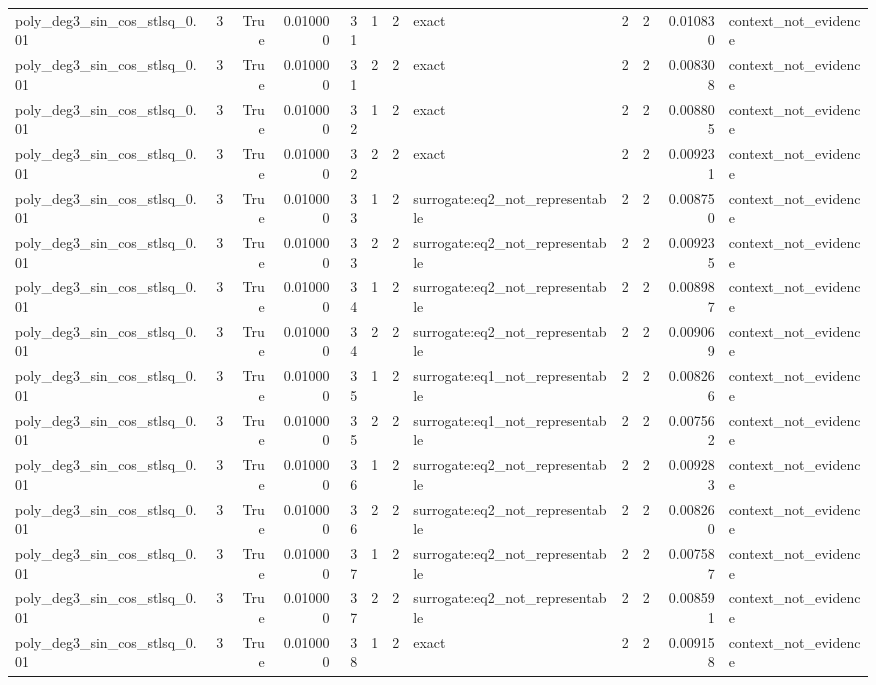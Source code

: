 \begin{tabular}{lrrrrrrlrrrl}
poly\_deg3\_sin\_cos\_stlsq\_0.01 & 3 & True & 0.010000 & 31 & 1 & 2 & exact & 2 & 2 & 0.010830 & context\_not\_evidence \\
poly\_deg3\_sin\_cos\_stlsq\_0.01 & 3 & True & 0.010000 & 31 & 2 & 2 & exact & 2 & 2 & 0.008308 & context\_not\_evidence \\
poly\_deg3\_sin\_cos\_stlsq\_0.01 & 3 & True & 0.010000 & 32 & 1 & 2 & exact & 2 & 2 & 0.008805 & context\_not\_evidence \\
poly\_deg3\_sin\_cos\_stlsq\_0.01 & 3 & True & 0.010000 & 32 & 2 & 2 & exact & 2 & 2 & 0.009231 & context\_not\_evidence \\
poly\_deg3\_sin\_cos\_stlsq\_0.01 & 3 & True & 0.010000 & 33 & 1 & 2 & surrogate:eq2\_not\_representable & 2 & 2 & 0.008750 & context\_not\_evidence \\
poly\_deg3\_sin\_cos\_stlsq\_0.01 & 3 & True & 0.010000 & 33 & 2 & 2 & surrogate:eq2\_not\_representable & 2 & 2 & 0.009235 & context\_not\_evidence \\
poly\_deg3\_sin\_cos\_stlsq\_0.01 & 3 & True & 0.010000 & 34 & 1 & 2 & surrogate:eq2\_not\_representable & 2 & 2 & 0.008987 & context\_not\_evidence \\
poly\_deg3\_sin\_cos\_stlsq\_0.01 & 3 & True & 0.010000 & 34 & 2 & 2 & surrogate:eq2\_not\_representable & 2 & 2 & 0.009069 & context\_not\_evidence \\
poly\_deg3\_sin\_cos\_stlsq\_0.01 & 3 & True & 0.010000 & 35 & 1 & 2 & surrogate:eq1\_not\_representable & 2 & 2 & 0.008266 & context\_not\_evidence \\
poly\_deg3\_sin\_cos\_stlsq\_0.01 & 3 & True & 0.010000 & 35 & 2 & 2 & surrogate:eq1\_not\_representable & 2 & 2 & 0.007562 & context\_not\_evidence \\
poly\_deg3\_sin\_cos\_stlsq\_0.01 & 3 & True & 0.010000 & 36 & 1 & 2 & surrogate:eq2\_not\_representable & 2 & 2 & 0.009283 & context\_not\_evidence \\
poly\_deg3\_sin\_cos\_stlsq\_0.01 & 3 & True & 0.010000 & 36 & 2 & 2 & surrogate:eq2\_not\_representable & 2 & 2 & 0.008260 & context\_not\_evidence \\
poly\_deg3\_sin\_cos\_stlsq\_0.01 & 3 & True & 0.010000 & 37 & 1 & 2 & surrogate:eq2\_not\_representable & 2 & 2 & 0.007587 & context\_not\_evidence \\
poly\_deg3\_sin\_cos\_stlsq\_0.01 & 3 & True & 0.010000 & 37 & 2 & 2 & surrogate:eq2\_not\_representable & 2 & 2 & 0.008591 & context\_not\_evidence \\
poly\_deg3\_sin\_cos\_stlsq\_0.01 & 3 & True & 0.010000 & 38 & 1 & 2 & exact & 2 & 2 & 0.009158 & context\_not\_evidence \\

\end{tabular}
